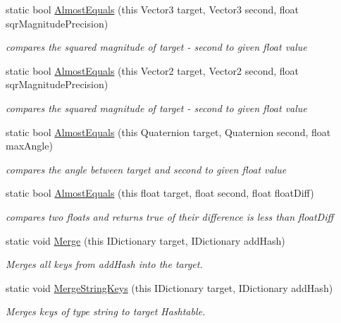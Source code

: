 \begin{DoxyCompactItemize}
\item 
static bool \hyperlink{class_extensions_a35fba37c30e813d78f40fbb4b88dca33}{Almost\+Equals} (this Vector3 target, Vector3 second, float sqr\+Magnitude\+Precision)
\begin{DoxyCompactList}\small\item\em compares the squared magnitude of target -\/ second to given float value\end{DoxyCompactList}\item 
static bool \hyperlink{class_extensions_a0d7e1279d0951869d76856a5ea84e7f3}{Almost\+Equals} (this Vector2 target, Vector2 second, float sqr\+Magnitude\+Precision)
\begin{DoxyCompactList}\small\item\em compares the squared magnitude of target -\/ second to given float value\end{DoxyCompactList}\item 
static bool \hyperlink{class_extensions_a7ce33f2b493f18ef1d30ffd06a249517}{Almost\+Equals} (this Quaternion target, Quaternion second, float max\+Angle)
\begin{DoxyCompactList}\small\item\em compares the angle between target and second to given float value\end{DoxyCompactList}\item 
static bool \hyperlink{class_extensions_a740813774fff222b8d4a4f23f2fa2326}{Almost\+Equals} (this float target, float second, float float\+Diff)
\begin{DoxyCompactList}\small\item\em compares two floats and returns true of their difference is less than float\+Diff\end{DoxyCompactList}\item 
static void \hyperlink{class_extensions_a6b5d90a1ed678d74548f4ce759b47043}{Merge} (this I\+Dictionary target, I\+Dictionary add\+Hash)
\begin{DoxyCompactList}\small\item\em Merges all keys from add\+Hash into the target. \end{DoxyCompactList}\item 
static void \hyperlink{class_extensions_ac37ceea048b52ed7df7dc2dc3ea49c04}{Merge\+String\+Keys} (this I\+Dictionary target, I\+Dictionary add\+Hash)
\begin{DoxyCompactList}\small\item\em Merges keys of type string to target Hashtable. \end{DoxyCompactList}\item 

\end{DoxyCompactItemize}
